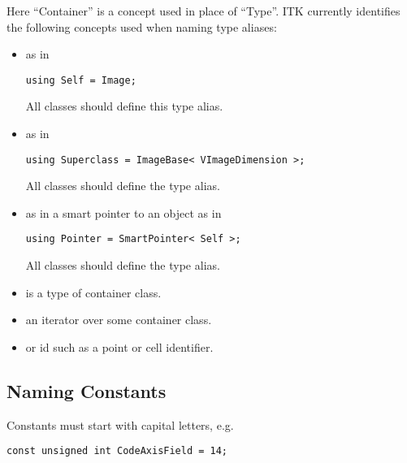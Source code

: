 Here ``Container'' is a concept used in place of ``Type''. ITK currently
identifies the following concepts used when naming type aliases:

\begin{itemize}
\item \textbf{} as in

\small
\begin{verbatim}
using Self = Image;
\end{verbatim}
\normalsize

All classes should define this type alias.
\item \textbf{} as in

\small
\begin{verbatim}
using Superclass = ImageBase< VImageDimension >;
\end{verbatim}
\normalsize

All classes should define the  type alias.
\item \textbf{} as in a smart pointer to an object as in

\begin{verbatim}
using Pointer = SmartPointer< Self >;
\end{verbatim}
\normalsize

All classes should define the  type alias.
\item \textbf{} is a type of container class.
\item \textbf{} an iterator over some container class.
\item \textbf{} or id such as a point or cell identifier.
\end{itemize}


\subsection{Naming Constants}
\label{subsec:NamingConstants}

Constants must start with capital letters, e.g.

\small
\begin{verbatim}
const unsigned int CodeAxisField = 14;
\end{verbatim}
\normalsize


